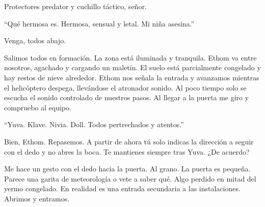 \reply Protectores predator y cuchillo táctico, señor.

``Qué hermosa es. Hermosa, sensual y letal. Mi niña asesina.''

\reply Venga, todos abajo.

Salimos todos en formación. La zona está iluminada y tranquila. Ethom va entre nosotros, agachado y cargando un maletín. El suelo está parcialmente congelado y hay restos de nieve alrededor.
Ethom nos señala la entrada y avanzamos mientras el helicóptero despega, llevándose el atronador sonido. Al poco tiempo solo se escucha el sonido controlado de nuestros pasos. Al llegar a la puerta me giro y compruebo al equipo.

``Yuva. Klave. Nivia. Doll. Todos pertrechados y atentos.''

\reply Bien, Ethom. Repasemos. A partir de ahora tú solo indicas la dirección a seguir con el dedo y no abres la boca. Te mantienes siempre tras Yuva. ¿De acuerdo?

Me hace un gesto con el dedo hacia la puerta. Al grano. La puerta es pequeña. Parece una garita de meteorología o vete a saber qué. Algo perdido en mitad del yermo congelado. En realidad es una entrada secundaria a las instalaciones. Abrimos y entramos.